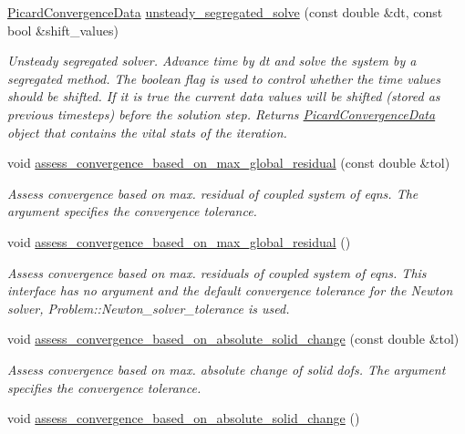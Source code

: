 \begin{DoxyCompactItemize}
\hyperlink{classoomph_1_1PicardConvergenceData}{Picard\+Convergence\+Data} \hyperlink{classoomph_1_1SegregatableFSIProblem_a17f019ebaf83e170219bf605a8554111}{unsteady\+\_\+segregated\+\_\+solve} (const double \&dt, const bool \&shift\+\_\+values)
\begin{DoxyCompactList}\small\item\em Unsteady segregated solver. Advance time by dt and solve the system by a segregated method. The boolean flag is used to control whether the time values should be shifted. If it is true the current data values will be shifted (stored as previous timesteps) before the solution step. Returns \hyperlink{classoomph_1_1PicardConvergenceData}{Picard\+Convergence\+Data} object that contains the vital stats of the iteration. \end{DoxyCompactList}\item 
void \hyperlink{classoomph_1_1SegregatableFSIProblem_a88eb2704f55c89db093cc2857490b727}{assess\+\_\+convergence\+\_\+based\+\_\+on\+\_\+max\+\_\+global\+\_\+residual} (const double \&tol)
\begin{DoxyCompactList}\small\item\em Assess convergence based on max. residual of coupled system of eqns. The argument specifies the convergence tolerance. \end{DoxyCompactList}\item 
void \hyperlink{classoomph_1_1SegregatableFSIProblem_a2fba426552e48abb7ff8a554c20953da}{assess\+\_\+convergence\+\_\+based\+\_\+on\+\_\+max\+\_\+global\+\_\+residual} ()
\begin{DoxyCompactList}\small\item\em Assess convergence based on max. residuals of coupled system of eqns. This interface has no argument and the default convergence tolerance for the Newton solver, Problem\+::\+Newton\+\_\+solver\+\_\+tolerance is used. \end{DoxyCompactList}\item 
void \hyperlink{classoomph_1_1SegregatableFSIProblem_aa0b531963389cf3b2ad253891931def9}{assess\+\_\+convergence\+\_\+based\+\_\+on\+\_\+absolute\+\_\+solid\+\_\+change} (const double \&tol)
\begin{DoxyCompactList}\small\item\em Assess convergence based on max. absolute change of solid dofs. The argument specifies the convergence tolerance. \end{DoxyCompactList}\item 
void \hyperlink{classoomph_1_1SegregatableFSIProblem_ae10cc55b3dc502ba387695e8c010b0c1}{assess\+\_\+convergence\+\_\+based\+\_\+on\+\_\+absolute\+\_\+solid\+\_\+change} ()

\end{DoxyCompactItemize}
